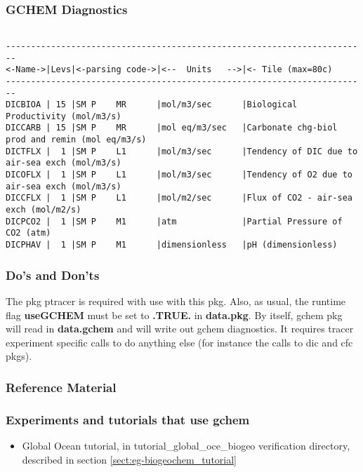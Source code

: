 \subsubsection{GCHEM Diagnostics}
\label{sec:pkg:gchem:diagnostics}

{\footnotesize
\begin{verbatim}

------------------------------------------------------------------------
<-Name->|Levs|<-parsing code->|<--  Units   -->|<- Tile (max=80c) 
------------------------------------------------------------------------
DICBIOA | 15 |SM P    MR      |mol/m3/sec      |Biological Productivity (mol/m3/s)
DICCARB | 15 |SM P    MR      |mol eq/m3/sec   |Carbonate chg-biol prod and remin (mol eq/m3/s)
DICTFLX |  1 |SM P    L1      |mol/m3/sec      |Tendency of DIC due to air-sea exch (mol/m3/s)
DICOFLX |  1 |SM P    L1      |mol/m3/sec      |Tendency of O2 due to air-sea exch (mol/m3/s)
DICCFLX |  1 |SM P    L1      |mol/m2/sec      |Flux of CO2 - air-sea exch (mol/m2/s)
DICPCO2 |  1 |SM P    M1      |atm             |Partial Pressure of CO2 (atm)
DICPHAV |  1 |SM P    M1      |dimensionless   |pH (dimensionless)
\end{verbatim}
}

\subsubsection{Do's and Don'ts}

The pkg ptracer is required with use with this pkg. Also, as usual, the
runtime flag \textbf{useGCHEM} must be set to \textbf{.TRUE.} in \textbf{data.pkg}.
By itself, gchem pkg will read in \textbf{data.gchem} and will
write out gchem diagnostics. It requires tracer experiment
specific calls to do anything else (for instance the calls
to dic and cfc pkgs).

\subsubsection{Reference Material}

\subsubsection{Experiments and tutorials that use gchem}
\label{sec:pkg:gchem:experiments}

\begin{itemize}
\item{Global Ocean tutorial, in tutorial\_global\_oce\_biogeo verification directory,   
described in section \ref{sect:eg-biogeochem_tutorial} }
\end{itemize}

